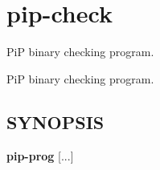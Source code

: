 \hypertarget{group__pip-check}{\section{pip-\/check}
\label{group__pip-check}
}


Pi\-P binary checking program.  


Pi\-P binary checking program. \hypertarget{group__piplnlibs_synopsis}{}\subsection{S\-Y\-N\-O\-P\-S\-I\-S}\label{group__piplnlibs_synopsis}
{ {\bfseries pip-\/prog} }\mbox{[}...\mbox{]} 